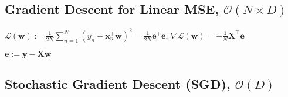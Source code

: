 \subsection*{Gradient Descent for Linear MSE, $\mathcal{O}(N\times D)$}



$
\mathcal{L}(\mathbf{w}) :=\frac{1}{2 N} \sum_{n=1}^{N}(y_{n}-\mathbf{x}_{n}^{\top} \mathbf{w})^{2} =\frac{1}{2 N} \mathbf{e}^{\top} \mathbf{e}
$,
$\nabla \mathcal{L}(\mathbf{w})=-\frac{1}{N} \mathbf{X}^{\top} \mathbf{e}$

$\mathbf{e} := \mathbf{y}-\mathbf{X w}$



\subsection*{Stochastic Gradient Descent (SGD), $\mathcal{O}(D)$}

